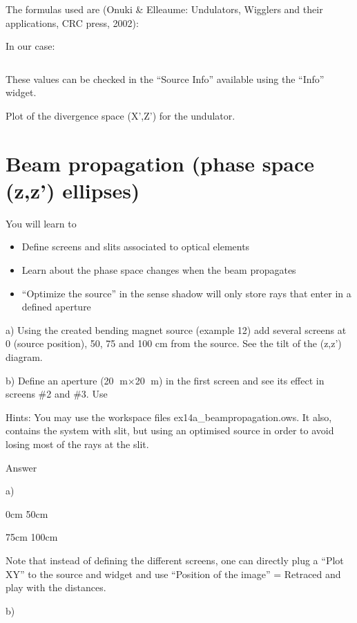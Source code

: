 \documentclass[]{article}
\providecommand{\tightlist}{%
  \setlength{\itemsep}{0pt}\setlength{\parskip}{0pt}}
\begin{document}
The formulas used are (Onuki \& Elleaume: Undulators, Wigglers and their
applications, CRC press, 2002):

In our case:

\begin{longtable}[]{@{}@{}}
\toprule
\tabularnewline
\tabularnewline
\tabularnewline
\bottomrule
\end{longtable}

These values can be checked in the ``Source Info'' available using the
``Info'' widget.

Plot of the divergence space (X',Z') for the undulator.

\section{Beam propagation (phase space (z,z')
ellipses)}\label{beam-propagation-phase-space-zz-ellipses}

You will learn to

\begin{itemize}
\tightlist
\item
  Define screens and slits associated to optical elements
\item
  Learn about the phase space changes when the beam propagates
\item
  ``Optimize the source'' in the sense shadow will only store rays that
  enter in a defined aperture
\end{itemize}

a) Using the created bending magnet source (example 12) add several
screens at 0 (source position), 50, 75 and 100 cm from the source. See
the tilt of the (z,z') diagram.

b) Define an aperture (20 m×20 m) in the first screen and see its
effect in screens \#2 and \#3. Use

Hints: You may use the workspace files ex14a\_beampropagation.ows. It
also, contains the system with slit, but using an optimised source in
order to avoid losing most of the rays at the slit.

Answer

a)

\protect\hypertarget{anchor-2}{}{}0cm 50cm

75cm 100cm

Note that instead of defining the different screens, one can directly
plug a ``Plot XY'' to the source and widget and use ``Position of the
image'' = Retraced and play with the distances.

b)
\end{document}
